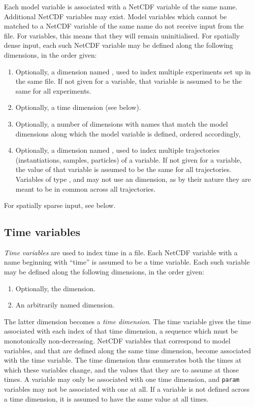 Each model variable is associated with a NetCDF variable of the same
name. Additional NetCDF variables may exist. Model variables which cannot be
matched to a NetCDF variable of the same name do not receive input from the
file. For  variables, this means that they will remain
uninitialised. For spatially dense input, each such NetCDF variable may be
defined along the following dimensions, in the order given:
\begin{enumerate}
\item Optionally, a dimension named , used to index multiple
  experiments set up in the same file. If not given for a variable, that
  variable is assumed to be the same for all experiments.
\item Optionally, a time dimension (see below).
\item Optionally, a number of dimensions with names that match the model
  dimensions along which the model variable is defined, ordered accordingly,
\item Optionally, a dimension named , used to index multiple
  trajectories (instantiations, samples, particles) of a variable. If not
  given for a variable, the value of that variable is assumed to be the same
  for all trajectories. Variables of type ,  and
   may not use an  dimension, as by their nature they are
  meant to be in common across all trajectories.
\end{enumerate}

For spatially sparse input, see  below.

\subsection{Time variables\label{Time_variables}}

\emph{Time variables} are used to index time in a file. Each NetCDF variable
with a name beginning with ``time'' is assumed to be a time variable. Each
such variable may be defined along the following dimensions, in the order
given:
\begin{enumerate}
\item Optionally, the  dimension.
\item An arbitrarily named dimension.
\end{enumerate}
The latter dimension becomes a \emph{time
  dimension}. The time variable gives the time
associated with each index of that time dimension, a sequence which must be
monotonically non-decreasing. NetCDF variables that correspond to model
variables, and that are defined along the same time dimension, become
associated with the time variable. The time dimension thus enumerates both the
times at which these variables change, and the values that they are to assume
at those times. A variable may only be associated with one time dimension, and
\texttt{param} variables may not be associated with one at all. If a variable
is not defined across a time dimension, it is assumed to have the same value
at all times.

